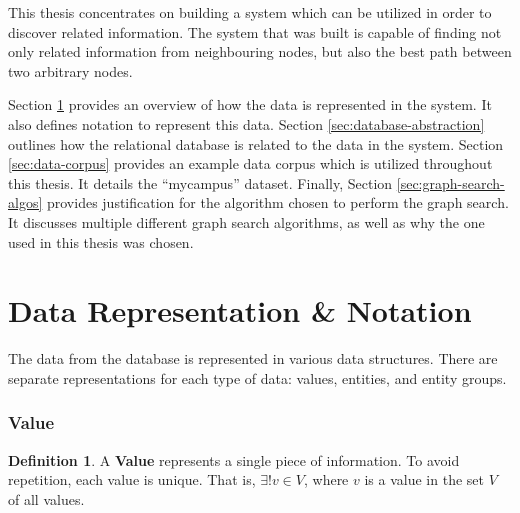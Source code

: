 \documentclass[12pt,letterpaper,oneside]{report}
\theoremstyle{definition}
\newtheorem{defn}{Definition}
\begin{document}
		This thesis concentrates on building a system which can be utilized in order to discover related information.  The system that was built is capable of finding not only related information from neighbouring nodes, but also the best path between two arbitrary nodes.
		
		Section \ref{sec:data-rep-and-notation} provides an overview of how the data is represented in the system.  It also defines notation to represent this data.  Section \ref{sec:database-abstraction} outlines how the relational database is related to the data in the system.  Section \ref{sec:data-corpus} provides an example data corpus which is utilized throughout this thesis.  It details the ``mycampus'' dataset.  Finally, Section \ref{sec:graph-search-algos} provides justification for the algorithm chosen to perform the graph search.  It discusses multiple different graph search algorithms, as well as why the one used in this thesis was chosen.
		
		\section{Data Representation \& Notation}
		\label{sec:data-rep-and-notation}
			The data from the database is represented in various data structures.  There are separate representations for each type of data:  values, entities, and entity groups.

				\subsubsection{Value}
					\begin{defn}
						A \textbf{Value} represents a single piece of information.  To avoid repetition, each value is unique.  That is, $\exists! v \in V$, where $v$ is a value in the set $V$ of all values.
					\end{defn}
\end{document}

